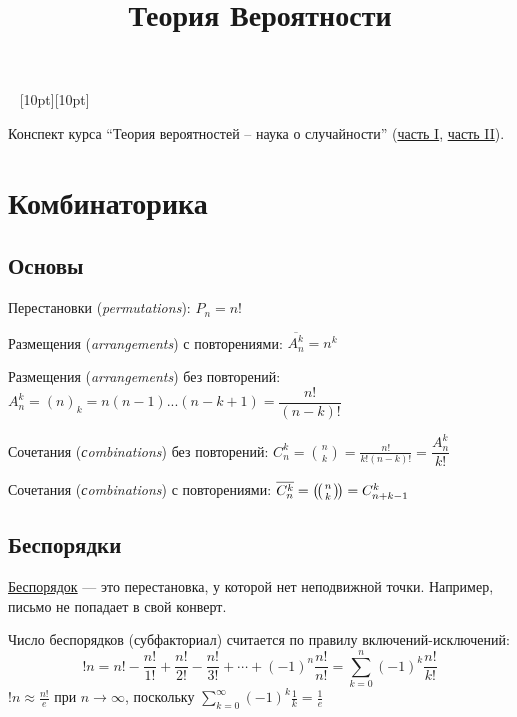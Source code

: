 \documentclass[a4paper,12pt,fleqn]{article}
\title{Теория Вероятности}
\author{}
\date{}
\numberwithin{figure}{section}
\theoremstyle{definition}
\newcommand{\mbinom}[2] { \left( \! \middle( \genfrac{}{}{0pt}{}{#1}{#2} \middle) \! \right) }
\def\vignette{\vspace{48pt} \noindent \hrulefill~
	          \raisebox{-8pt}[10pt][10pt]{\Huge\ding{102}}
	          ~\hrulefill}
\begin{document}
\maketitle
\tableofcontents


\vignette

Конспект курса ``Теория вероятностей -- наука о случайности''
(\href{https://stepik.org/course/2911}{часть I},
 \href{https://stepik.org/course/3209}{часть II}).


\section{Комбинаторика}

\subsection{Основы}

Перестановки (\textit{permutations}): $P_n = n!$

Размещения (\textit{arrangements}) с повторениями:
$\overline{A_n^k} = n^k$

Размещения (\textit{arrangements}) без повторений:
$A_n^k = (n)_k = n(n-1)...(n-k+1) = \dfrac{n!}{(n-k)!}$

Сочетания (\textit{сombinations}) без повторений:
$C_n^k = \binom{n}{k} = \frac{n!}{k!(n-k)!} = \dfrac{A_n^k}{k!}$

Сочетания (\textit{сombinations}) с повторениями:
$\overline{C_n^k} = \mbinom{n}{k} = C_{n+k-1}^k$


\subsection{Беспорядки}

\href{https://ru.wikipedia.org/wiki/Беспорядок_(перестановка)}{Беспорядок} --- это
перестановка, у которой нет неподвижной точки. Например, письмо не попадает в свой конверт.

Число беспорядков (субфакториал) считается по правилу включений-исключений:
\[	!n = n! -\frac{n!}{1!} +\frac{n!}{2!} -\frac{n!}{3!}+\dotsm+(-1)^n\frac{n!}{n!}
       = \sum_{k=0}^n (-1)^k\frac{n!}{k!}	\]
$!n \approx \frac{n!}{e}$ при $n\to\infty$,
поскольку $\sum_{k=0}^{\infty} (-1)^k\frac1k = \frac1e$
\end{document}
